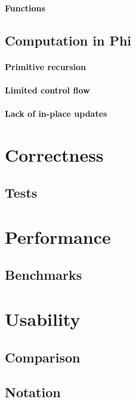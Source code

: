 \paragraph{Functions}

\subsection{Computation in Phi}

\paragraph{Primitive recursion}

\paragraph{Limited control flow}

\paragraph{Lack of in-place updates}

\section{Correctness}

\subsection{Tests}

\section{Performance}

\subsection{Benchmarks}

\section{Usability}

\subsection{Comparison}

\subsection{Notation}

